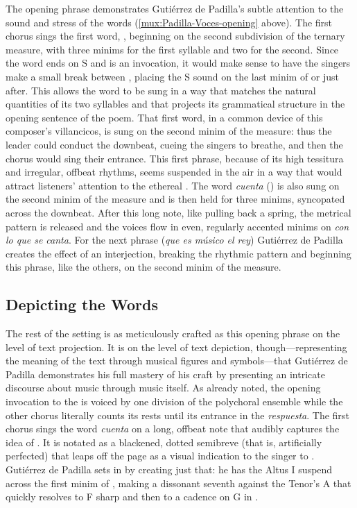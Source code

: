 The opening phrase demonstrates Gutiérrez de Padilla's subtle attention to the
sound and stress of the words (\cref{mux:Padilla-Voces-opening} above).
The first chorus sings the first word, , beginning on the second
subdivision of the ternary measure, with three minims for the first syllable and
two for the second.
Since the word ends on S and is an invocation, it would make sense to have the
singers make a small break between , placing the S sound on the
last minim of  or just after.
This allows the word to be sung in a way that matches the natural quantities of
its two syllables and that projects its grammatical structure in the opening
sentence of the poem.
That first word, in a common device of this composer's villancicos, is sung on
the second minim of the measure: thus the leader could conduct the downbeat,
cueing the singers to breathe, and then the chorus would sing their entrance. 
This first phrase, because of its high tessitura and irregular, offbeat rhythms,
seems suspended in the air in a way that would attract listeners' attention to
the ethereal . 
The word \emph{cuenta} () is also sung on the second minim of the
measure and is then held for three minims, syncopated across the downbeat.
After this long note, like pulling back a spring, the metrical pattern is
released and the voices flow in even, regularly accented minims on \emph{con lo
que se canta}.
For the next phrase (\emph{que es músico el rey}) Gutiérrez de Padilla creates
the effect of an interjection, breaking the rhythmic pattern and beginning this
phrase, like the others, on the second minim of the measure.

\subsection{Depicting the Words}

The rest of the setting is as meticulously crafted as this opening phrase on the
level of text projection.
It is on the level of text depiction, though---representing the meaning of the text
through musical figures and symbols---that Gutiérrez de Padilla demonstrates his
full mastery of his craft by presenting an intricate discourse about music
through music itself.
As already noted, the opening invocation to the  is voiced by one division of the polychoral
ensemble while the other chorus literally counts its rests until its entrance in
the \emph{respuesta}.
The first chorus sings the word \emph{cuenta} on a long, offbeat note that
audibly captures the idea of .
It is notated as a blackened, dotted semibreve (that is, artificially perfected)
that leaps off the page as a visual indication to the singer to .
Gutiérrez de Padilla sets  in 
by creating just that: he has the Altus I suspend across the first minim of
, making a dissonant seventh against the Tenor's A that quickly
resolves to F sharp and then to a cadence on G in .

